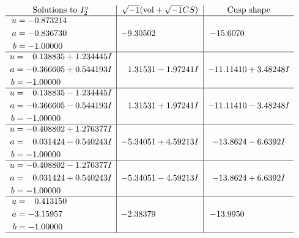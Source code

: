 \documentclass[1p]{elsarticle_modified}
\theoremstyle{definition}
\newcommand{\I}{\sqrt{-1}}
\begin{document}
$$\begin{array}{c|c|c}  
\text{Solutions to }I^u_{2}& \I (\text{vol} + \sqrt{-1}CS) & \text{Cusp shape}\\
 \hline 
\begin{aligned}
u &= -0.873214\phantom{ +0.000000I} \\
a &= -0.836730\phantom{ +0.000000I} \\
b &= -1.00000\phantom{ +0.000000I}\end{aligned}
 & -9.30502\phantom{ +0.000000I} & -15.6070\phantom{ +0.000000I} \\ \hline\begin{aligned}
u &= \phantom{-}0.138835 + 1.234445 I \\
a &= -0.366605 + 0.544193 I \\
b &= -1.00000\phantom{ +0.000000I}\end{aligned}
 & \phantom{-}1.31531 - 1.97241 I & -11.11410 + 3.48248 I \\ \hline\begin{aligned}
u &= \phantom{-}0.138835 - 1.234445 I \\
a &= -0.366605 - 0.544193 I \\
b &= -1.00000\phantom{ +0.000000I}\end{aligned}
 & \phantom{-}1.31531 + 1.97241 I & -11.11410 - 3.48248 I \\ \hline\begin{aligned}
u &= -0.408802 + 1.276377 I \\
a &= \phantom{-}0.031424 - 0.540243 I \\
b &= -1.00000\phantom{ +0.000000I}\end{aligned}
 & -5.34051 + 4.59213 I & -13.8624 - 6.6392 I \\ \hline\begin{aligned}
u &= -0.408802 - 1.276377 I \\
a &= \phantom{-}0.031424 + 0.540243 I \\
b &= -1.00000\phantom{ +0.000000I}\end{aligned}
 & -5.34051 - 4.59213 I & -13.8624 + 6.6392 I \\ \hline\begin{aligned}
u &= \phantom{-}0.413150\phantom{ +0.000000I} \\
a &= -3.15957\phantom{ +0.000000I} \\
b &= -1.00000\phantom{ +0.000000I}\end{aligned}
 & -2.38379\phantom{ +0.000000I} & -13.9950\phantom{ +0.000000I}\\
 \hline 
 \end{array}$$\newpage\newpage\renewcommand{\arraystretch}{1}
\end{document}
